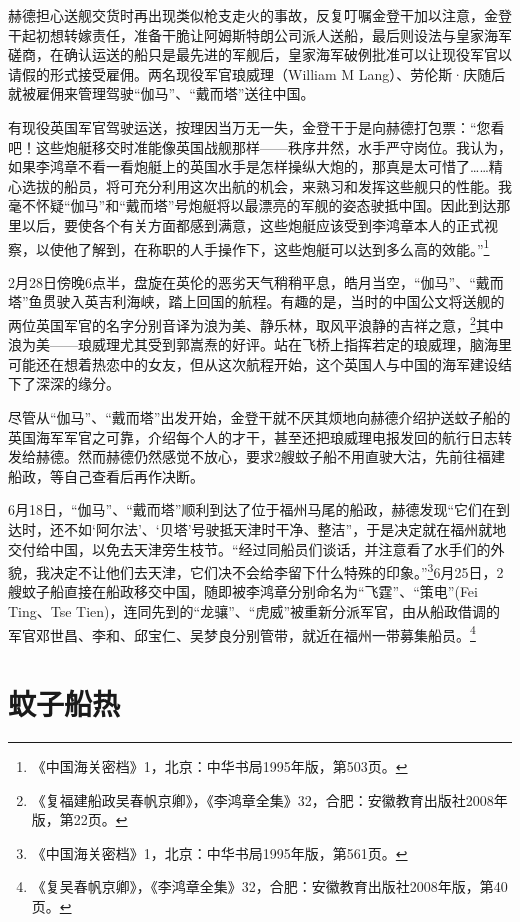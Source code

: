 \documentclass[12pt,UTF8]{ctexbook}
\begin{document}
赫德担心送舰交货时再出现类似枪支走火的事故，反复叮嘱金登干加以注意，金登干起初想转嫁责任，准备干脆让阿姆斯特朗公司派人送船，最后则设法与皇家海军磋商，在确认运送的船只是最先进的军舰后，皇家海军破例批准可以让现役军官以请假的形式接受雇佣。两名现役军官琅威理（William M Lang）、劳伦斯·庆随后就被雇佣来管理驾驶“伽马”、“戴而塔”送往中国。

有现役英国军官驾驶运送，按理因当万无一失，金登干于是向赫德打包票：“您看吧！这些炮艇移交时准能像英国战舰那样——秩序井然，水手严守岗位。我认为，如果李鸿章不看一看炮艇上的英国水手是怎样操纵大炮的，那真是太可惜了……精心选拔的船员，将可充分利用这次出航的机会，来熟习和发挥这些舰只的性能。我毫不怀疑“伽马”和“戴而塔”号炮艇将以最漂亮的军舰的姿态驶抵中国。因此到达那里以后，要使各个有关方面都感到满意，这些炮艇应该受到李鸿章本人的正式视察，以使他了解到，在称职的人手操作下，这些炮艇可以达到多么高的效能。”\footnote{《中国海关密档》1，北京：中华书局1995年版，第503页。}

2月28日傍晚6点半，盘旋在英伦的恶劣天气稍稍平息，皓月当空，“伽马”、“戴而塔”鱼贯驶入英吉利海峡，踏上回国的航程。有趣的是，当时的中国公文将送舰的两位英国军官的名字分别音译为浪为美、静乐林，取风平浪静的吉祥之意，\footnote{《复福建船政吴春帆京卿》，《李鸿章全集》32，合肥：安徽教育出版社2008年版，第22页。}其中浪为美——琅威理尤其受到郭嵩焘的好评。站在飞桥上指挥若定的琅威理，脑海里可能还在想着热恋中的女友，但从这次航程开始，这个英国人与中国的海军建设结下了深深的缘分。

尽管从“伽马”、“戴而塔”出发开始，金登干就不厌其烦地向赫德介绍护送蚊子船的英国海军军官之可靠，介绍每个人的才干，甚至还把琅威理电报发回的航行日志转发给赫德。然而赫德仍然感觉不放心，要求2艘蚊子船不用直驶大沽，先前往福建船政，等自己查看后再作决断。

6月18日，“伽马”、“戴而塔”顺利到达了位于福州马尾的船政，赫德发现“它们在到达时，还不如‘阿尔法’、‘贝塔’号驶抵天津时干净、整洁”，于是决定就在福州就地交付给中国，以免去天津旁生枝节。“经过同船员们谈话，并注意看了水手们的外貌，我决定不让他们去天津，它们决不会给李留下什么特殊的印象。”\footnote{《中国海关密档》1，北京：中华书局1995年版，第561页。}6月25日，2艘蚊子船直接在船政移交中国，随即被李鸿章分别命名为“飞霆”、“策电”(Fei Ting、Tse Tien)，连同先到的“龙骧”、“虎威”被重新分派军官，由从船政借调的军官邓世昌、李和、邱宝仁、吴梦良分别管带，就近在福州一带募集船员。\footnote{《复吴春帆京卿》，《李鸿章全集》32，合肥：安徽教育出版社2008年版，第40页。}

\section{蚊子船热}
\end{document}
